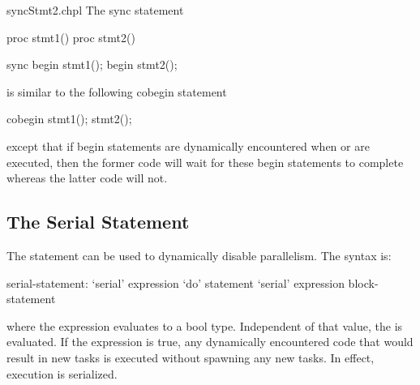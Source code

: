 \begin{chapelexample}{syncStmt2.chpl}
The sync statement
\begin{chapelpre}
proc stmt1() { }
proc stmt2() { }
\end{chapelpre}
\begin{chapel}
sync {
  begin stmt1();
  begin stmt2();
}
\end{chapel}
is similar to the following cobegin statement
\begin{chapel}
cobegin {
  stmt1();
  stmt2();
}
\end{chapel}
\begin{chapeloutput}
\end{chapeloutput}
except that if begin statements are dynamically encountered
when  or  are executed, then the former
code will wait for these begin statements to complete whereas the
latter code will not.
\end{chapelexample}

\subsection{The Serial Statement}
\label{Serial}

The  statement can be used to dynamically disable
parallelism.  The syntax is:
\begin{syntax}
serial-statement:
  `serial' expression `do' statement
  `serial' expression block-statement
\end{syntax}
where the expression evaluates to a bool type.  Independent of that
value, the  is evaluated. If the expression is true,
any dynamically encountered code that would result in new tasks is
executed without spawning any new tasks.  In effect, execution is
serialized.

